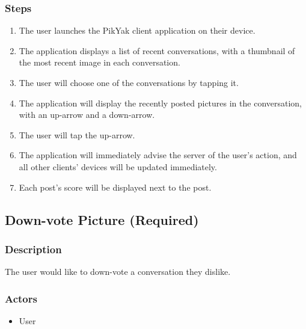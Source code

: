 \documentclass[11pt]{scrartcl}
\begin{document}
        \subsubsection{Steps}
            \begin{enumerate}
                \item The user launches the PikYak client application on their device.
                \item The application displays a list of recent conversations, with a thumbnail of the most recent image in each conversation.
                \item The user will choose one of the conversations by tapping it.
                \item The application will display the recently posted pictures in the conversation, with an up-arrow and a down-arrow.
                \item The user will tap the up-arrow.
                \item The application will immediately advise the server of the user's action, and all other clients' devices will be updated immediately.
                \item Each post's score will be displayed next to the post.
            \end{enumerate}

    \subsection{Down-vote Picture (Required)}
        \subsubsection{Description}
            The user would like to down-vote a conversation they dislike.
        \subsubsection{Actors}
            \begin{itemize}
                \item User
            \end{itemize}
\end{document}
